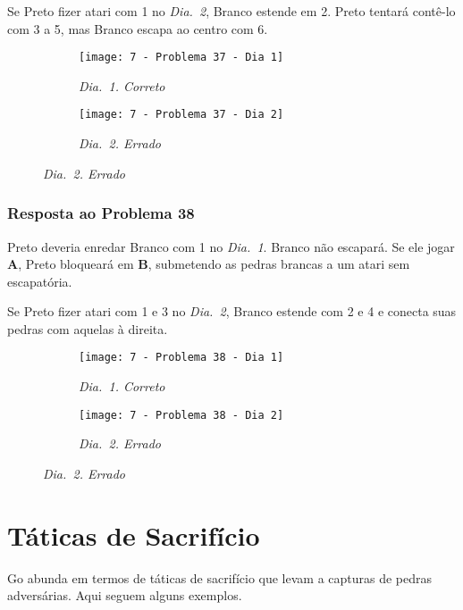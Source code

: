 Se Preto fizer atari com 1 no \emph{Dia.\@~2}, Branco estende em 2. Preto tentará contê-lo com 3 a 5, mas Branco escapa ao centro com 6.

\begin{figure}[h!]
    \centering
    \begin{subfigure}[t]{.31\textwidth}
        \texttt{[image: 7 - Problema 37 - Dia 1]}
        \caption*{\emph{Dia.\@~1. Correto}}
    \end{subfigure}
    \hspace{1cm}
    \begin{subfigure}[t]{.31\textwidth}
        \texttt{[image: 7 - Problema 37 - Dia 2]}
        \caption*{\emph{Dia.\@~2. Errado}}
    \end{subfigure}
\end{figure}

\subsubsection*{Resposta ao Problema 38}

Preto deveria enredar Branco com 1 no \emph{Dia.\@~1}. Branco não escapará. Se ele jogar \textbf{A}, Preto bloqueará em \textbf{B}, submetendo as pedras brancas a um atari sem escapatória.
    
Se Preto fizer atari com 1 e 3 no \emph{Dia.\@~2}, Branco estende com 2 e 4 e conecta suas pedras com aquelas à direita.

\begin{figure}[h!]
    \centering
    \begin{subfigure}[t]{.31\textwidth}
        \texttt{[image: 7 - Problema 38 - Dia 1]}
        \caption*{\emph{Dia.\@~1. Correto}}
    \end{subfigure}
    \hspace{1cm}
    \begin{subfigure}[t]{.31\textwidth}
        \texttt{[image: 7 - Problema 38 - Dia 2]}
        \caption*{\emph{Dia.\@~2. Errado}}
    \end{subfigure}
\end{figure}

\pagebreak

\section{Táticas de Sacrifício}

Go abunda em termos de táticas de sacrifício que levam a capturas de pedras adversárias. Aqui seguem alguns exemplos.

